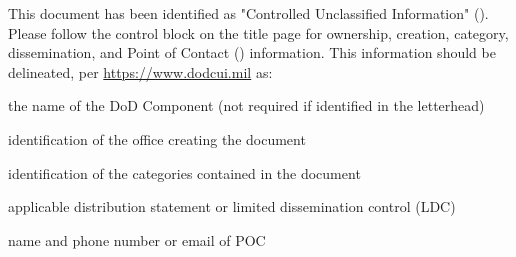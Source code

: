 This document has been identified as "Controlled Unclassified Information" (\CUI).
Please follow the control block on the title page for ownership, creation, category, dissemination, and Point of Contact (\POC) information.
This information should be delineated, per \url{https://www.dodcui.mil} as:
\begin{description}[itemindent=5pt,topsep=0pt,itemsep=0pt,partopsep=0pt, parsep=0pt]
	\item[Owner] the name of the DoD Component (not required if identified in the letterhead)
	\item[Creator] identification of the office creating the document
	\item[Category] identification of the categories contained in the document
	\item[Dissemination]applicable distribution statement or limited dissemination control (LDC)
	\item[\POC]name and phone number or email of POC
\end{description}
